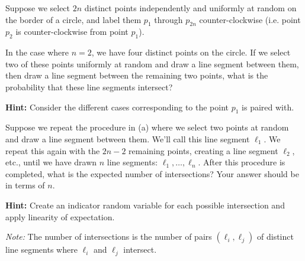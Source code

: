 \documentclass[12pt]{exam}
\begin{document}
Suppose we select $2n$ distinct points independently and uniformly at random on the border of a circle, and label them $p_1$ through $p_{2n}$ counter-clockwise (i.e. point $p_2$ is counter-clockwise from point $p_1$).

\begin{qparts}
    \item In the case where $n=2$, we have four distinct points on the circle. If we select two of these points uniformly at random and draw a line segment between them, then draw a line segment between the remaining two points, what is the probability that these line segments intersect?
    
    \textbf{Hint:} Consider the different cases corresponding to the point $p_1$ is paired with.
    
    \item Suppose we repeat the procedure in (a) where we select two points at random and draw a line segment between them. We'll call this line segment $\ell_1.$ We repeat this again with the $2n-2$ remaining points, creating a line segment $\ell_2$, etc., until we have drawn $n$ line segments: $\ell_1,\dots,\ell_n.$ After this procedure is completed, what is the expected number of intersections? Your answer should be in terms of $n.$
    
    \textbf{Hint:} Create an indicator random variable for each possible intersection and apply linearity of expectation.
    
    \textit{Note:} The number of intersections is the number of pairs $(\ell_i,\ell_j)$ of distinct line segments where $\ell_i$ and $\ell_j$ intersect.
\end{qparts}
\end{document}

